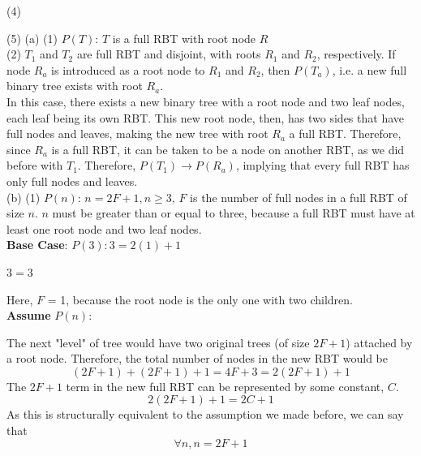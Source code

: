 \documentclass[]{article}
\def\imp{\rightarrow}
\newcommand\tab[1][0.62cm]{\hspace*{#1}}
\begin{document}
\noindent (4)


\newpage

\noindent (5) (a) (1) $P(T)$: $T$ is a full RBT with root node $R$ \\

\tab (2) $T_1$ and $T_2$ are full RBT and disjoint, with roots $R_1$ and $R_2$, respectively. If node $R_a$ is introduced as a root node to $R_1$ and $R_2$, then 
$P(T_a)$, i.e. a new full binary tree exists with root $R_a$. \\

In this case, there exists a new binary tree with a root node and two leaf nodes, each leaf being its own RBT. This new root node, then, has two sides that have full nodes and leaves, making the new tree with root $R_a$ a full RBT. Therefore, since $R_a$ is a full RBT, it can be taken to be a node on another RBT, as we did before with $T_1$. Therefore, $P(T_1) \imp P(R_a)$, implying that every full RBT has only full nodes and leaves. \\

(b) (1) $P(n)$: $n = 2F + 1, n \geq 3$, $F$ is the number of full nodes in a full RBT of size $n$. $n$ must be greater than or equal to three, because a full RBT must have at least one root node and two leaf nodes. \\

\textbf{Base Case}: $P(3): 3 = 2(1) + 1$

$3 = 3$

Here, $F$ = 1, because the root node is the only one with two children. \\

\textbf{Assume} $P(n)$:

The next "level" of tree would have two original trees (of size $2F+1$) attached by a root node. Therefore, the total number of nodes in the new RBT would be 
$$(2F+1) + (2F+1) + 1= 4F + 3 = 2(2F+1)+1$$
The $2F+1$ term in the new full RBT can be represented by some constant, $C$. 
$$2(2F+1)+1 = 2C+1$$
As this is structurally equivalent to the assumption we made before, we can say that
$$\forall n, n = 2F+1$$
\end{document}
